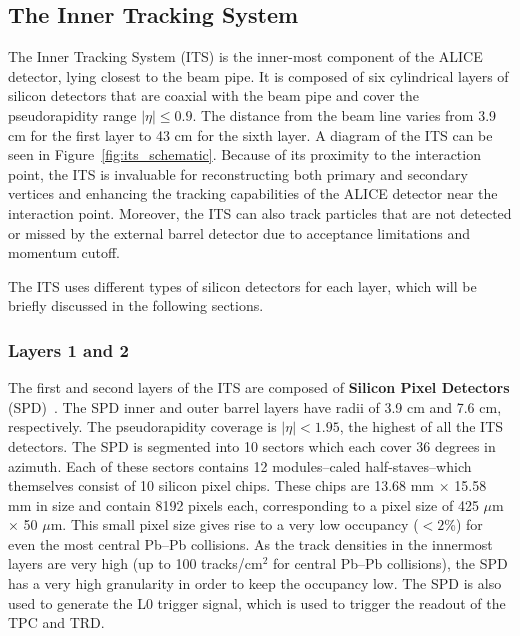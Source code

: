 \subsection{The Inner Tracking System}

The Inner Tracking System (ITS) is the inner-most component of the ALICE detector, lying closest to the beam pipe. It is composed of six cylindrical layers of silicon detectors that are coaxial with the beam pipe and cover the pseudorapidity range $|\eta| \leq 0.9$. The distance from the beam line varies from 3.9 cm for the first layer to 43 cm for the sixth layer. A diagram of the ITS can be seen in Figure~\ref{fig:its_schematic}. Because of its proximity to the interaction point, the ITS is invaluable for reconstructing both primary and secondary vertices and enhancing the tracking capabilities of the ALICE detector near the interaction point. Moreover, the ITS can also track particles that are not detected or missed by the external barrel detector due to acceptance limitations and momentum cutoff. 

The ITS uses different types of silicon detectors for each layer, which will be briefly discussed in the following sections.

\subsubsection{Layers 1 and 2}

The first and second layers of the ITS are composed of \textbf{Silicon Pixel Detectors} (SPD)~\cite{ITSSPD}. The SPD inner and outer barrel layers have radii of 3.9 cm and 7.6 cm, respectively. The pseudorapidity coverage is $|\eta| < 1.95$, the highest of all the ITS detectors. The SPD is segmented into 10 sectors which each cover 36 degrees in azimuth. Each of these sectors contains 12 modules--caled half-staves--which themselves consist of 10 silicon pixel chips. These chips are 13.68 mm $\times$ 15.58 mm in size and contain 8192 pixels each, corresponding to a pixel size of 425 $\mu$m $\times$ 50 $\mu$m. This small pixel size gives rise to a very low occupancy ($<2$\%) for even the most central Pb--Pb collisions.  As the track densities in the innermost layers are very high (up to 100 tracks/cm$^2$ for central Pb--Pb collisions), the SPD has a very high granularity in order to keep the occupancy low. The SPD is also used to generate the L0 trigger signal, which is used to trigger the readout of the TPC and TRD.


